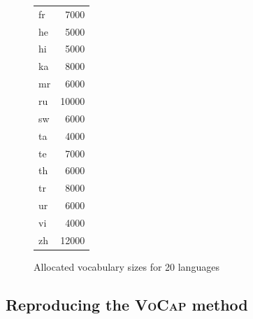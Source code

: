\begin{figure}[ht]
\begin{subtable}{0.32\textwidth}
\begin{tabular}{lr}
            fr & 7000 \\
            he & 5000 \\
            hi & 5000 \\
            ka & 8000 \\
            mr & 6000 \\
            ru & 10000 \\
            sw & 6000 \\
            ta & 4000 \\
            te & 7000 \\
            th & 6000 \\
            tr & 8000 \\
            ur & 6000 \\
            vi & 4000 \\
            zh & 12000 \\
            \bottomrule
        \end{tabular}
        \caption{\citet{zheng_allocating_2021}}
        \label{tab:zheng_allocations}
    \end{subtable}


    \caption{Allocated vocabulary sizes for 20 languages}
    \label{fig:multiple_tables}
\end{figure}
% 
% 
% 
% 

% 
% 
% 
% 

\subsection{Reproducing the \textsc{VoCap} method}


